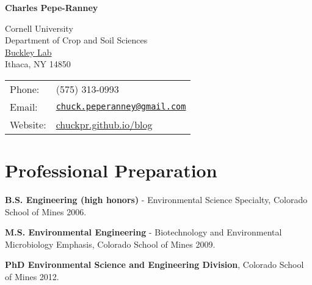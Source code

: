 \documentclass[letterpaper]{article}
\def\name{\textbf{Charles Pepe-Ranney}}
\renewenvironment{itemize}{
  \begin{list}{}{
    \setlength{\leftmargin}{1.5em}
  }
}{
  \end{list}
}
\begin{document}
{\Large \name}


\vspace{0.125in}

\begin{minipage}{0.45\linewidth}
  Cornell University \\
  Department of Crop and Soil Sciences \\
  \href{http://www.css.cornell.edu/faculty/buckley/}{Buckley Lab} \\
  Ithaca, NY 14850
\end{minipage}
\begin{minipage}{0.45\linewidth}
  \begin{tabular}{ll}
    Phone: & (575) 313-0993 \\
    Email: & \href{mailto:chuck.peperanney@gmail.com}{\tt chuck.peperanney@gmail.com} \\
    Website: & \href{https://chuckpr.github.io/blog}{chuckpr.github.io/blog} 
  \end{tabular}
\end{minipage}
\section*{Professional Preparation}
\begin{itemize}
    \item \textbf{B.S. Engineering (high honors)} - Environmental Science Specialty, Colorado School of Mines 2006.
    \item \textbf{M.S. Environmental Engineering} - Biotechnology and Environmental Microbiology Emphasis, Colorado School of Mines 2009.
    \item \textbf{PhD Environmental Science and Engineering Division}, Colorado School of Mines 2012.
\end{itemize}
\end{document}
